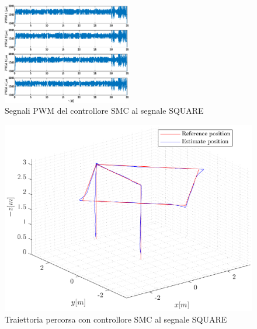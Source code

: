 \begin{figure}
	\centering
	\includegraphics[width=0.5\textwidth]{Simulazioni/Figure/SMC/SQUARE/PWM}
	\caption{Segnali PWM del controllore SMC al segnale SQUARE}
	\label{fig:SQUAREPWMSMC}
\end{figure}
\begin{figure}
	\centering
	\includegraphics[width=1\textwidth]{Simulazioni/Figure/SMC/SQUARE/Trajectory}
	\caption{Traiettoria percorsa con controllore SMC al segnale SQUARE}
	\label{fig:SQUAREtraSMC}
\end{figure}

